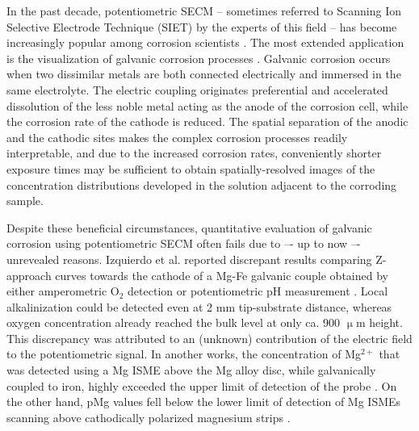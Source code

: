 \documentclass[3p]{elsarticle}
\begin{document}
In the past decade, potentiometric SECM -- sometimes referred to Scanning Ion Selective Electrode Technique (SIET) by the experts of this field -- has become increasingly popular among corrosion scientists \cite{lamaka, ZnISME, diamondel, cutedge, H+selective, simulating}.
The most extended application is the visualization of galvanic corrosion processes \cite{amperopot, chloride, spatiozn, fezn}.
Galvanic corrosion occurs when two dissimilar metals are both connected electrically and immersed in the same electrolyte. 
The electric coupling originates preferential and accelerated dissolution of the less noble metal acting as the anode of the corrosion cell, while the corrosion rate of the cathode is reduced.
The spatial separation of the anodic and the cathodic sites makes the complex corrosion processes readily interpretable, and due to the increased corrosion rates, conveniently shorter exposure times may be sufficient to obtain spatially-resolved images of the concentration distributions developed in the solution adjacent to the corroding sample.

Despite these beneficial circumstances, quantitative evaluation of galvanic corrosion using potentiometric SECM often fails due to –- up to now –- unrevealed reasons.
Izquierdo et al. reported discrepant results comparing Z-approach curves towards the cathode of a Mg-Fe galvanic couple obtained by either amperometric O$_2$ detection or potentiometric pH measurement \cite{pH15}. Local alkalinization could be detected even at 2 mm tip-substrate distance, whereas oxygen concentration already reached the bulk level at only ca. 900 $\upmu$m height. This discrepancy was attributed to an (unknown) contribution of the electric field to the potentiometric signal.  
In another works, the concentration of Mg$^{2+}$ that was detected using a Mg ISME above the Mg alloy disc, while galvanically coupled to iron, highly exceeded the upper limit of detection of the probe \cite{overmg1, overmg2, overmg3}.
On the other hand, pMg values fell below the lower limit of detection of Mg ISMEs scanning above cathodically polarized magnesium strips \cite{belowmg}. 
\end{document}
